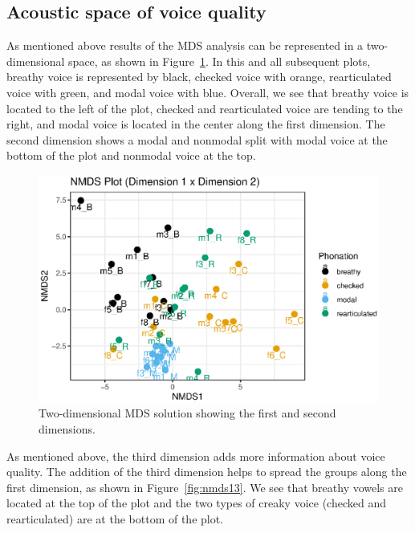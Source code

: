 \subsection{Acoustic space of voice quality} \label{sec:acousticlandscape:space}
As mentioned above results of the MDS analysis can be represented in a two-dimensional space, as shown in Figure~\ref{fig:nmds12}. In this and all subsequent plots, breathy voice is represented by black, checked voice with orange, rearticulated voice with green, and modal voice with blue. Overall, we see that breathy voice is located to the left of the plot, checked and rearticulated voice are tending to the right, and modal voice is located in the center along the first dimension. The second dimension shows a modal and nonmodal split with modal voice at the bottom of the plot and nonmodal voice at the top.
\begin{figure}[!h]
    \centering
    \includegraphics[width = \linewidth]{images/nmds12.eps}
    \caption{Two-dimensional MDS solution showing the first and second dimensions.}
    \label{fig:nmds12}
\end{figure}
    
As mentioned above, the third dimension adds more information about voice quality. The addition of the third dimension helps to spread the groups along the first dimension, as shown in Figure~\ref{fig:nmds13}. We see that breathy vowels are located at the top of the plot and the two types of creaky voice (checked and rearticulated) are at the bottom of the plot. 

